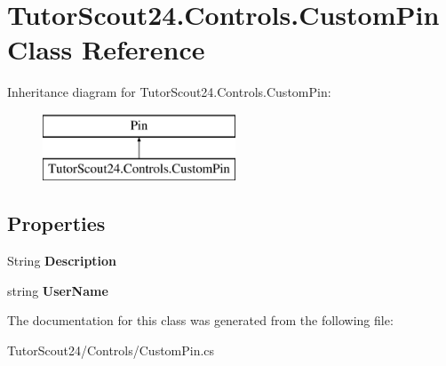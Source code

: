 \hypertarget{class_tutor_scout24_1_1_controls_1_1_custom_pin}{}\section{Tutor\+Scout24.\+Controls.\+Custom\+Pin Class Reference}
\label{class_tutor_scout24_1_1_controls_1_1_custom_pin}
Inheritance diagram for Tutor\+Scout24.\+Controls.\+Custom\+Pin\+:\begin{figure}[H]
\begin{center}
\leavevmode
\includegraphics[height=2.000000cm]{class_tutor_scout24_1_1_controls_1_1_custom_pin}
\end{center}
\end{figure}
\subsection*{Properties}
\begin{DoxyCompactItemize}
\item 
\mbox{\label{class_tutor_scout24_1_1_controls_1_1_custom_pin_aa940df31a7caca8b0b44aba92da3b3d5}} 
String {\bfseries Description}
\item 
\mbox{\label{class_tutor_scout24_1_1_controls_1_1_custom_pin_a59960405349b74f76a89d3ae49df2422}} 
string {\bfseries User\+Name}
\end{DoxyCompactItemize}


The documentation for this class was generated from the following file\+:\begin{DoxyCompactItemize}
\item 
Tutor\+Scout24/\+Controls/Custom\+Pin.\+cs\end{DoxyCompactItemize}
